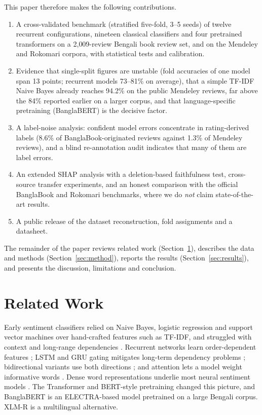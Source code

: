 \documentclass[journal]{IEEEtran}
\begin{document}
This paper therefore makes the following contributions.
\begin{enumerate}
\item A cross-validated benchmark (stratified five-fold, 3--5 seeds) of twelve recurrent configurations, nineteen classical classifiers and four pretrained transformers on a 2{,}009-review Bengali book review set, and on the Mendeley and Rokomari corpora, with statistical tests and calibration.
\item Evidence that single-split figures are unstable (fold accuracies of one model span 13 points; recurrent models 73--81\% on average), that a simple TF-IDF Naive Bayes already reaches 94.2\% on the public Mendeley reviews, far above the 84\% reported earlier on a larger corpus, and that language-specific pretraining (BanglaBERT) is the decisive factor.
\item A label-noise analysis: confident model errors concentrate in rating-derived labels (8.6\% of BanglaBook-originated reviews against 1.3\% of Mendeley reviews), and a blind re-annotation audit indicates that many of them are label errors.
\item An extended SHAP analysis with a deletion-based faithfulness test, cross-source transfer experiments, and an honest comparison with the official BanglaBook and Rokomari benchmarks, where we do \emph{not} claim state-of-the-art results.
\item A public release of the dataset reconstruction, fold assignments and a datasheet.
\end{enumerate}
The remainder of the paper reviews related work (Section~\ref{sec:related}), describes the data and methods (Section~\ref{sec:method}), reports the results (Section~\ref{sec:results}), and presents the discussion, limitations and conclusion.

\section{Related Work}\label{sec:related}
Early sentiment classifiers relied on Naive Bayes, logistic regression and support vector machines over hand-crafted features such as TF-IDF, and struggled with context and long-range dependencies \cite{pang2002}. Recurrent networks learn order-dependent features \cite{mikolov2010}; LSTM and GRU gating mitigates long-term dependency problems \cite{hochreiter1997,cho2014}; bidirectional variants use both directions \cite{schuster1997}; and attention lets a model weight informative words \cite{bahdanau2015,wang2016}. Dense word representations underlie most neural sentiment models \cite{mikolov2013}. The Transformer \cite{vaswani2017} and BERT-style pretraining \cite{devlin2019} changed this picture, and BanglaBERT \cite{bhattacharjee2022} is an ELECTRA-based model pretrained on a large Bengali corpus. XLM-R \cite{conneau2020} is a multilingual alternative.
\end{document}

